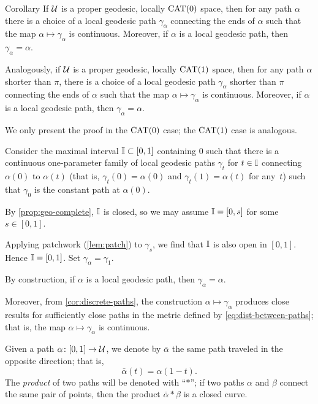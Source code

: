 \begin{thm}{Corollary}\label{cor:path-geod}
If $\mathcal{U}$ is a proper geodesic, locally $\mathrm{CAT}(0)$ space, then 
for any path $\alpha$ there is a choice of a local geodesic path $\gamma_\alpha$  connecting the ends of $\alpha$ such that the map $\alpha\mapsto\gamma_\alpha$ is continuous.
Moreover, if $\alpha$ is a local geodesic path, then $\gamma_\alpha=\alpha$.

Analogously, if $\mathcal{U}$ is a proper geodesic, locally $\mathrm{CAT}(1)$ space, then for any path $\alpha$ shorter than $\pi$, there is a choice of a local geodesic path $\gamma_\alpha$ shorter than $\pi$ connecting the ends of $\alpha$ such that the map $\alpha\mapsto\gamma_\alpha$ is continuous.
Moreover, if $\alpha$ is a local geodesic path, then $\gamma_\alpha=\alpha$.
\end{thm}

We only present the proof in the $\mathrm{CAT}(0)$ case;
the $\mathrm{CAT}(1)$ case is analogous.

Consider the maximal interval $\mathbb{I}\subset[0,1]$ containing $0$
such that there is a continuous one-parameter family of 
local geodesic paths $\gamma_t$ for $t\in \mathbb{I}$ connecting $\alpha(0)$ to $\alpha(t)$ (that is, $\gamma_t(0)=\alpha(0)$ and $\gamma_t(1)=\alpha(t)$ for any~$t$) such that $\gamma_0$ is the constant path at $\alpha(0)$.

By \ref{prop:geo-complete}, $\mathbb{I}$ is closed,
so we may assume $\mathbb{I}=[0,s]$ for some $s\in [0,1]$.

Applying  patchwork (\ref{lem:patch}) to  $\gamma_{s}$, 
we find that $\mathbb{I}$ is also open in $[0,1]$. 
Hence $\mathbb{I}=[0,1]$.
Set $\gamma_\alpha=\gamma_1$.

By construction,  if $\alpha$ is a local geodesic path, then $\gamma_\alpha=\alpha$. 

Moreover, from \ref{cor:discrete-paths},
the construction $\alpha\mapsto \gamma_\alpha$ produces close results for sufficiently close paths in the metric defined by \ref{eq:dist-between-paths};
that is, the map  $\alpha\mapsto \gamma_\alpha$ is continuous.
\qeds

Given a path $\alpha\colon[0,1]\to\mathcal{U}$,
we denote by $\bar\alpha$ the same path traveled in the opposite direction;
that is,
\[\bar\alpha(t)=\alpha(1-t).\]
The \emph{product} of two paths  will be denoted with ``$*$'';
if two paths $\alpha$ and $\beta$ connect the same pair of points, then the product $\bar\alpha*\beta$ is a closed curve.

